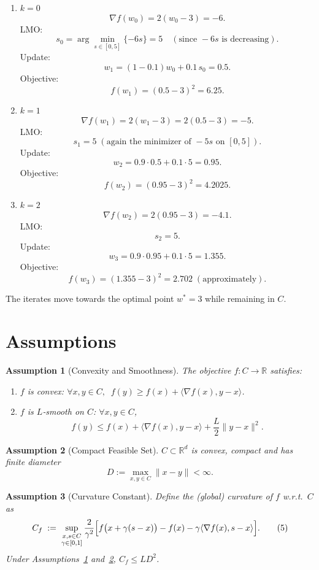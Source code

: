 \documentclass{article}
\newtheorem{assumption}{Assumption}
\newcommand{\R}{\mathbb{R}}
\begin{document}
\begin{enumerate}[label=Iteration \arabic*:,leftmargin=*]
\item $k=0$  
\[
\nabla f(w_{0})=2(w_{0}-3)=-6.
\]
LMO:
\[
s_{0}=\arg\min_{s\in[0,5]}\{-6s\}=5\quad(\text{since }-6s\text{ is decreasing}).
\]
Update:
\[
w_{1}= (1-0.1)w_{0}+0.1\,s_{0}=0.5.
\]
Objective:
\[
f(w_{1})=(0.5-3)^{2}=6.25.
\]

\item $k=1$  
\[
\nabla f(w_{1})=2(w_{1}-3)=2(0.5-3)=-5.
\]
LMO:
\[
s_{1}=5\;(\text{again the minimizer of }-5s\text{ on }[0,5]).
\]
Update:
\[
w_{2}=0.9\cdot0.5+0.1\cdot5=0.95.
\]
Objective:
\[
f(w_{2})=(0.95-3)^{2}=4.2025.
\]

\item $k=2$  
\[
\nabla f(w_{2})=2(0.95-3)=-4.1.
\]
LMO:
\[
s_{2}=5.
\]
Update:
\[
w_{3}=0.9\cdot0.95+0.1\cdot5=1.355.
\]
Objective:
\[
f(w_{3})=(1.355-3)^{2}=2.702\;(\text{approximately}).
\]
\end{enumerate}
The iterates move towards the optimal point $w^{*}=3$ while remaining in $C$.

\newpage
\section*{Assumptions}
\begin{assumption}[Convexity and Smoothness]\label{as:convexsmooth}
The objective $f:C\to\R$ satisfies:
\begin{enumerate}[label=(\alph*)]
\item $f$ is convex: $\forall x,y\in C,\;\;f(y)\ge f(x)+\langle\nabla f(x),y-x\rangle$.
\item $f$ is $L$‑smooth on $C$: $\forall x,y\in C$,
\[
f(y)\le f(x)+\langle\nabla f(x),y-x\rangle+\frac{L}{2}\|y-x\|^{2}.
\tag{3}
\]
\end{enumerate}
\end{assumption}

\begin{assumption}[Compact Feasible Set]\label{as:compact}
$C\subset\R^{d}$ is convex, compact and has finite diameter
\[
D:=\max_{x,y\in C}\|x-y\|<\infty .
\tag{4}
\]
\end{assumption}

\begin{assumption}[Curvature Constant]\label{as:curvature}
Define the (global) curvature of $f$ w.r.t.\ $C$ as
\[
C_{f}\;:=\;\sup_{\substack{x,s\in C\\ \gamma\in[0,1]}}
\frac{2}{\gamma^{2}}\Bigl[f\big(x+\gamma(s-x)\big)-f(x)-\gamma\langle\nabla f(x),s-x\rangle\Bigr].
\tag{5}
\]
Under Assumptions~\ref{as:convexsmooth} and~\ref{as:compact}, $C_{f}\le L D^{2}$.
\end{assumption}
\end{document}
